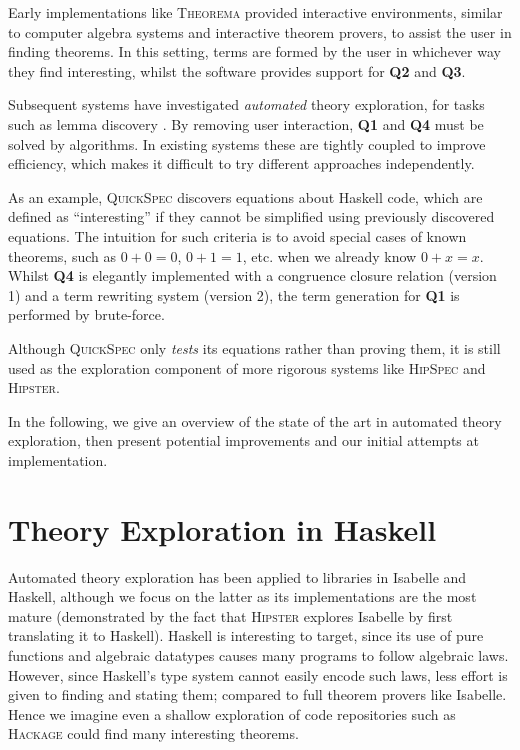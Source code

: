\documentclass{llncs}
\begin{document}
Early implementations like \textsc{Theorema} \cite{buchberger2000theory}
provided interactive environments, similar to computer algebra systems and
interactive theorem provers, to assist the user in finding theorems. In this
setting, terms are formed by the user in whichever way they find interesting,
whilst the software provides support for \textbf{Q2} and \textbf{Q3}.

Subsequent systems have investigated \emph{automated} theory exploration, for
tasks such as lemma discovery \cite{Hipster}. By removing user interaction,
\textbf{Q1} and \textbf{Q4} must be solved by algorithms. In existing
systems these are tightly coupled to improve efficiency, which makes it
difficult to try different approaches independently.

As an example, \textsc{QuickSpec} \cite{QuickSpec} discovers equations about
Haskell code, which are defined as ``interesting'' if they cannot be simplified
using previously discovered equations. The intuition for such criteria is to
avoid special cases of known theorems, such as $0 + 0 = 0$, $0 + 1 = 1$, etc.
when we already know $0 + x = x$. Whilst \textbf{Q4} is elegantly implemented
with a congruence closure relation (version 1) and a term rewriting system
(version 2), the term generation for \textbf{Q1} is performed by brute-force.

Although \textsc{QuickSpec} only \emph{tests} its equations rather than
proving them, it is still used as the exploration component of more rigorous
systems like \textsc{HipSpec} and \textsc{Hipster}.

In the following, we give an overview of the state of the art in automated
theory exploration, then present potential improvements and our initial attempts
at implementation.

\section{Theory Exploration in Haskell}\label{haskell}

Automated theory exploration has been applied to libraries in Isabelle
and Haskell, although we focus on the latter as its implementations are
the most mature (demonstrated by the fact that \textsc{Hipster} explores
Isabelle by first translating it to Haskell). Haskell is interesting to target,
since its use of pure functions and algebraic datatypes causes many programs to
follow algebraic laws. However, since Haskell's type system cannot easily
encode such laws, less effort is given to finding and stating them; compared to
full theorem provers like Isabelle. Hence we imagine even a shallow exploration
of code repositories such as \textsc{Hackage} could find many interesting
theorems.
\end{document}
